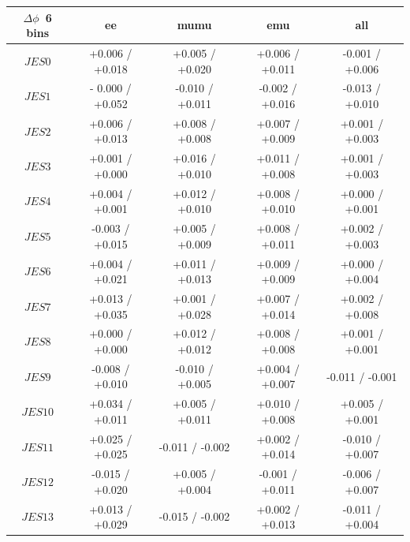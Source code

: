 \begin{table}[htbp]

\footnotesize
\begin{center}
   \begin{tabular}{|c|c|c|c|c|}
   \hline
   \textbf{$\Delta\phi$~6 bins}               &  ee &mumu &emu&all\\
   \hline
   $JES 0$                             &  +0.006   / +0.018   & +0.005   / +0.020   & +0.006   / +0.011   & -0.001   / +0.006   \\
   $JES 1$                             &  - 0.000   / +0.052   & -0.010   / +0.011   & -0.002   / +0.016   & -0.013   / +0.010   \\
   $JES 2$                             &  +0.006   / +0.013   & +0.008   / +0.008   & +0.007   / +0.009   & +0.001   / +0.003   \\
   $JES 3$                             &  +0.001   / +0.000   & +0.016   / +0.010   & +0.011   / +0.008   & +0.001   / +0.003   \\
   $JES 4$                             &  +0.004   / +0.001   & +0.012   / +0.010   & +0.008   / +0.010   & +0.000    / +0.001   \\
   $JES 5$                             &  -0.003   / +0.015   & +0.005   / +0.009   & +0.008   / +0.011   & +0.002   / +0.003   \\
   $JES 6$                             &  +0.004   / +0.021   & +0.011   / +0.013   & +0.009   / +0.009   & +0.000    / +0.004   \\
   $JES 7$                             &  +0.013   / +0.035   & +0.001   / +0.028   & +0.007   / +0.014   & +0.002   / +0.008   \\
   $JES 8$                             &  +0.000    / +0.000    & +0.012   / +0.012   & +0.008   / +0.008   & +0.001   / +0.001   \\
   $JES 9$                             &  -0.008   / +0.010   & -0.010   / +0.005   & +0.004   / +0.007   & -0.011   / -0.001   \\
   $JES {10}$                          &  +0.034   / +0.011   & +0.005   / +0.011   & +0.010   / +0.008   & +0.005   / +0.001   \\
   $JES {11}$                          &  +0.025   / +0.025   & -0.011   / -0.002   & +0.002   / +0.014   & -0.010   / +0.007   \\
   $JES {12}$                          &  -0.015   / +0.020   & +0.005   / +0.004   & -0.001   / +0.011   & -0.006   / +0.007   \\
   $JES {13}$                          &  +0.013   / +0.029   & -0.015   / -0.002   & +0.002   / +0.013   & -0.011   / +0.004   \\

\end{tabular}
\end{center}
\end{table}
